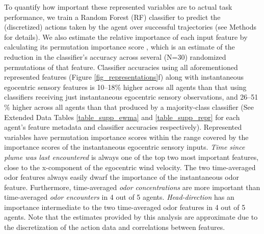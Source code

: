 \documentclass[5p,twocolumn,authoryear]{elsarticle}
\begin{document}
To quantify how important these represented variables are to actual task performance, we train a Random Forest (RF) \citep{breiman2001random} classifier to predict the (discretized) actions taken by the agent over successful trajectories 
(see Methods for details).
We also estimate the relative importance of each input feature by calculating its permutation importance score \citep{strobl2008conditional, breiman2001random}, which is an estimate of the reduction in the classifier’s accuracy across several (N=30) randomized permutations of that feature.
Classifier accuracies using all aforementioned represented features (Figure \ref{fig_representations}f) along with instantaneous egocentric sensory features is 10--18\% higher across all agents than that using classifiers receiving just instantaneous egocentric sensory observations, and 26--51$\%$ higher across all agents than that produced by a majority-class classifier 
(See Extended Data Tables \ref{table_supp_ewma} and \ref{table_supp_repr} for each agent's feature metadata and classifier accuracies respectively). 
Represented variables have permutation importance scores within the range covered by the importance scores of the instantaneous egocentric sensory inputs.
\textit{Time since plume was last encountered} is always one of the top two most important features, close to the x-component of the egocentric wind velocity.
The two time-averaged odor features always easily dwarf the importance of the instantaneous odor feature.
Furthermore, time-averaged \textit{odor concentrations} are more important than time-averaged \textit{odor encounters} in 4 out of 5 agents.
\textit{Head-direction} has an importance intermediate to the two time-averaged odor features in 4 out of 5 agents.
Note that the estimates provided by this analysis are approximate due to the discretization of the action data and correlations between features.
\end{document}
